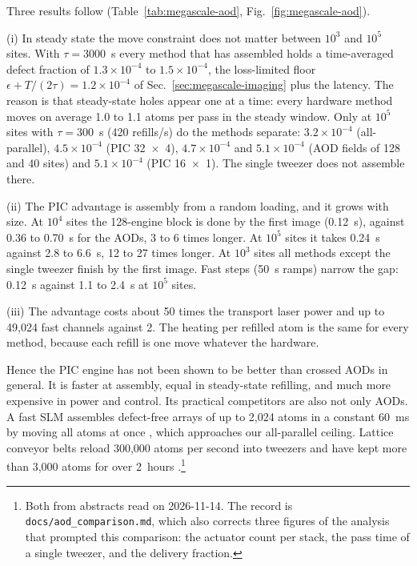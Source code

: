 Three results follow (Table~\ref{tab:megascale-aod}, Fig.~\ref{fig:megascale-aod}).

(i) In steady state the move constraint does not matter between $10^3$ and $10^5$ sites. With $\tau=3000$~s every method that has assembled holds a time-averaged defect fraction of $1.3\times10^{-4}$ to $1.5\times10^{-4}$, the loss-limited floor $\epsilon+T/(2\tau)=1.2\times10^{-4}$ of Sec.~\ref{sec:megascale-imaging} plus the latency. The reason is that steady-state holes appear one at a time: every hardware method moves on average 1.0 to 1.1 atoms per pass in the steady window. Only at $10^5$ sites with $\tau=300$~s (420 refills/s) do the methods separate: $3.2\times10^{-4}$ (all-parallel), $4.5\times10^{-4}$ (PIC 32~$\times$~4), $4.7\times10^{-4}$ and $5.1\times10^{-4}$ (AOD fields of 128 and 40 sites) and $5.1\times10^{-4}$ (PIC 16~$\times$~1). The single tweezer does not assemble there.

(ii) The PIC advantage is assembly from a random loading, and it grows with size. At $10^4$ sites the 128-engine block is done by the first image (0.12~s), against 0.36 to 0.70~s for the AODs, 3 to 6 times longer. At $10^5$ sites it takes 0.24~s against 2.8 to 6.6~s, 12 to 27 times longer. At $10^3$ sites all methods except the single tweezer finish by the first image. Fast steps (50~\textmu s ramps) narrow the gap: 0.12~s against 1.1 to 2.4~s at $10^5$ sites.

(iii) The advantage costs about 50 times the transport laser power and up to 49,024 fast channels against 2. The heating per refilled atom is the same for every method, because each refill is one move whatever the hardware.

Hence the PIC engine has not been shown to be better than crossed AODs in general. It is faster at assembly, equal in steady-state refilling, and much more expensive in power and control. Its practical competitors are also not only AODs. A fast SLM assembles defect-free arrays of up to 2,024 atoms in a constant 60~ms by moving all atoms at once \cite{lin2024}, which approaches our all-parallel ceiling. Lattice conveyor belts reload 300,000 atoms per second into tweezers and have kept more than 3,000 atoms for over 2~hours \cite{chiu2025}.\footnote{Both from abstracts read on 2026-11-14. The record is \texttt{docs/\allowbreak aod\_comparison.md}, which also corrects three figures of the analysis that prompted this comparison: the actuator count per stack, the pass time of a single tweezer, and the delivery fraction.}

